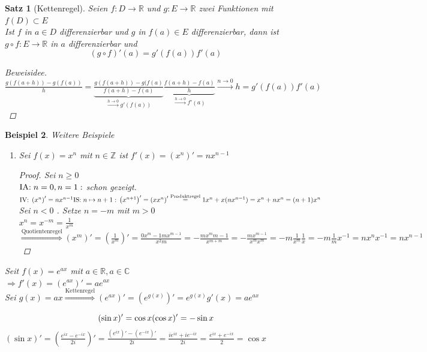 \documentclass[a4paper,titlepage,oneside]{article}
\def\C{\ensuremath{\mathbb{C}} }
\def\Z{\ensuremath{\mathbb{Z}} }
\def\R{\ensuremath{\mathbb{R}} }
\def\im{\ensuremath{\mathit{i}} }
\def\e{\ensuremath{\mathit{e}} }
\newcommand{\IA}[1][n=0]{\vspace{0.1pt}\ensuremath{\text{IA:}\sp#1:}}
\newcommand{\IV}{\vspace{0.1pt}\ensuremath{\text{IV:}\sp}}
\newcommand{\IS}[1][n \mapsto n+1]{\vspace{0.1pt}\ensuremath{\text{IS:}\sp#1:}}
\def\sp{\hspace{0,1cm}}
\newcommand{\longtonull}[1][n]{\ensuremath{\overset{\scriptscriptstyle{#1 \to 0}}{\longrightarrow}}}
\theoremstyle{thmstyle}
\newtheorem{satz}{Satz}[section]
\newtheorem{bsp}[satz]{Beispiel}
\theoremstyle{subthmstyle}
\begin{document}
\begin{satz}[Kettenregel]
Seien $f: D \to \R$ und $g : E \to \R$ zwei Funktionen mit $f(D) \subset E$\\
Ist $f$ in $a \in D$ differenzierbar und $g$ in $f(a) \in E$ differenzierbar, dann ist $g \circ f : E \to \R $ in $a$ differenzierbar und \[ \left(g \circ f\right)'(a) = g'(f(a)) f'(a)\]
\begin{proof}[Beweisidee]
$\frac{g(f(a+h)) - g(f(a))}{h} = \underbrace{\frac{g(f(a+h)) - g(f(a)}{f(a+h)-f(a)}}_{\longtonull[h] g'(f(a))} \underbrace{\frac{f(a+h) - f(a)}{h}}_{\longtonull[h] f'(a)} \longtonull{h} = g'(f(a))f'(a)$
\end{proof}
\end{satz}

\begin{bsp} Weitere Beispiele
\begin{enumerate}
\item Sei $f(x) = x^n$ mit $n \in \Z$ ist $f'(x) = \left(x^n\right)' = n x^{n-1}$
\begin{proof} Sei $n \ge 0$ \\
$\IA[n=0, n=1] $ schon gezeigt.\\
$\IV \left(x^n\right)' = n x^{n-1}\\
\IS \\
\left(x^{n+1}\right)' = \left(x x^n\right)' \overset{\text{Produktregel}}{=} 1 x^n + x (n x^{n-1}) = x^n + n x^n = (n+1) x^n$\\
Sei $n < 0$ . Setze $n = -m$ mit $m > 0$\\
$x^n = x^{-m} = \frac{1}{x^m}$
$\overset{\text{Quotientenregel}}{\Rightarrow} \left(x^m\right)' = \left(\frac{1}{x^m}\right)' = \frac{0 x^m - 1 m x^{m-1}}{x^2m} = - \frac{m x^m{m-1}}{x^{m+m}} = - \frac{mx^{m-1}}{x^mx^m} = -m \frac{1}{x^m}\frac{1}{x} = - m \frac{1}{m} x^{-1} = n x^n x^{-1} = n x^{n-1}$
\end{proof}
\end{enumerate}
\item Seit $f(x) = \e^{ax}$ mit $a \in \R , a \in \C$\\
$\Rightarrow f'(x) = (\e^{ax})' = a \e^{ax}$\\
Sei $g(x) = ax \overset{\text{Kettenregel}}{\Rightarrow}  (\e^{ax})' =  (\e^{g(x)})' =  \e^{g(x)}g'(x) =  a \e^{ax}$
\item \[(\sin x)' = \cos x \\ (\cos x)' = - \sin x\]
$\displaystyle (\sin x)' = \left( \frac{\e^{\im x} - \e^{-\im x}}{2\im}\right)' = \frac{(\e^{\im x})' - (\e^{-\im x})'}{2\im} = \frac{\im \e^{\im x} + \im \e^{-\im x}}{2\im} = \frac{\e^{\im x} + \e^{-\im x}}{2} = \cos x $\\

\end{bsp}
\end{document}
